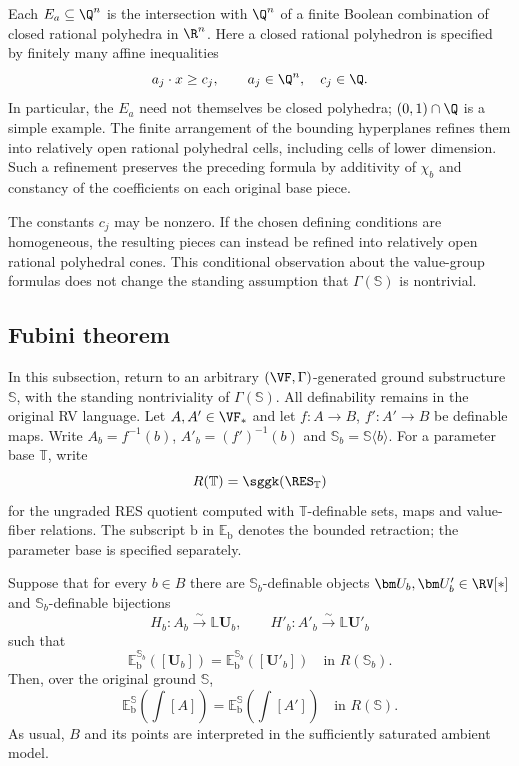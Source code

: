 \begin{rem}
Each $E_a\subseteq\Q^n$ is the intersection with $\Q^n$ of
a finite Boolean combination of closed rational polyhedra in
$\R^n$. Here a closed rational polyhedron is specified by
finitely many affine inequalities
\[
 a_j\cdot x\geq c_j,\qquad a_j\in\Q^n,\quad c_j\in\Q.
\]
In particular, the $E_a$ need not themselves be closed
polyhedra; $(0,1)\cap\Q$ is a simple example.
The finite arrangement of the bounding hyperplanes refines
them into relatively open rational polyhedral cells, including
cells of lower dimension. Such a refinement preserves the
preceding formula by additivity of $\chi_b$ and constancy of
the coefficients on each original base piece.

The constants $c_j$ may be nonzero. If the chosen defining
conditions are homogeneous, the resulting pieces can instead
be refined into relatively open rational polyhedral cones.
This conditional observation about the value-group formulas
does not change the standing assumption that
$\Gamma(\mathbb S)$ is nontrivial.
\end{rem}

\subsection{Fubini theorem}
In this subsection, return to an arbitrary
$(\VF,\Gamma)$-generated ground substructure $\mathbb S$,
with the standing nontriviality of $\Gamma(\mathbb S)$.
All definability remains in the original RV language.
Let $A,A'\in\VF_*$ and let
$f:A\to B$, $f':A'\to B$ be definable maps.
Write $A_b=f^{-1}(b)$, $A'_b=(f')^{-1}(b)$ and
$\mathbb S_b=\mathbb S\langle b\rangle$.
For a parameter base $\mathbb T$, write
\[
 R(\mathbb T)=\sggk(\RES_{\mathbb T})
\]
for the ungraded RES quotient computed with
$\mathbb T$-definable sets, maps and value-fiber relations.
The subscript $\mathrm b$ in $\mathbb E_{\mathrm b}$ denotes
the bounded retraction; the parameter base is specified
separately.

\begin{thm}\label{fubini}
Suppose that for every $b\in B$ there are
$\mathbb S_b$-definable objects
$\bm U_b,\bm U'_b\in\RV[*]$ and
$\mathbb S_b$-definable bijections
\[
 H_b:A_b\xrightarrow{\ \sim\ }\mathbb L\bm U_b,
 \qquad
 H'_b:A'_b\xrightarrow{\ \sim\ }\mathbb L\bm U'_b
\]
such that
\[
 \mathbb E_{\mathrm b}^{\mathbb S_b}([\bm U_b])
 =
 \mathbb E_{\mathrm b}^{\mathbb S_b}([\bm U'_b])
 \quad\text{in }R(\mathbb S_b).
\]
Then, over the original ground $\mathbb S$,
\[
 \mathbb E_{\mathrm b}^{\mathbb S}\!\left(\int[A]\right)
 =
 \mathbb E_{\mathrm b}^{\mathbb S}\!\left(\int[A']\right)
 \quad\text{in }R(\mathbb S).
\]
As usual, $B$ and its points are interpreted in the sufficiently
saturated ambient model.
\end{thm}

